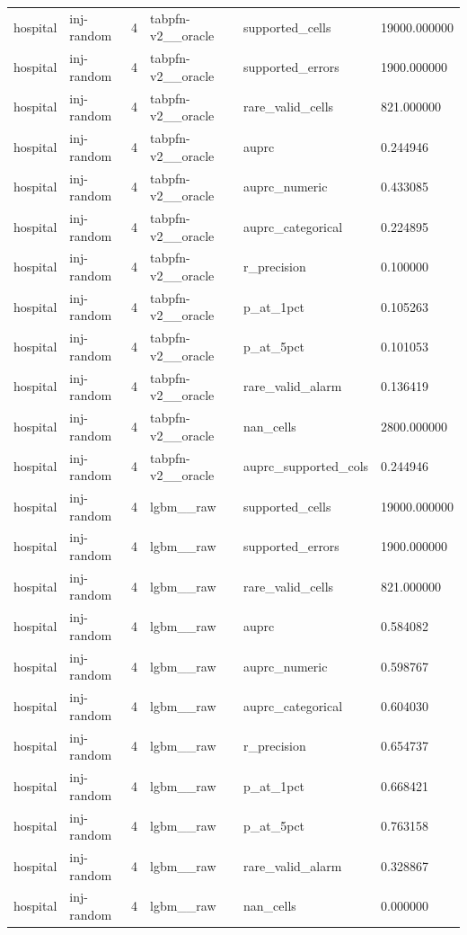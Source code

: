 \begin{tabular}{llllll}
hospital & inj-random & 4 & tabpfn-v2\_\_oracle & supported\_cells & 19000.000000 \\
hospital & inj-random & 4 & tabpfn-v2\_\_oracle & supported\_errors & 1900.000000 \\
hospital & inj-random & 4 & tabpfn-v2\_\_oracle & rare\_valid\_cells & 821.000000 \\
hospital & inj-random & 4 & tabpfn-v2\_\_oracle & auprc & 0.244946 \\
hospital & inj-random & 4 & tabpfn-v2\_\_oracle & auprc\_numeric & 0.433085 \\
hospital & inj-random & 4 & tabpfn-v2\_\_oracle & auprc\_categorical & 0.224895 \\
hospital & inj-random & 4 & tabpfn-v2\_\_oracle & r\_precision & 0.100000 \\
hospital & inj-random & 4 & tabpfn-v2\_\_oracle & p\_at\_1pct & 0.105263 \\
hospital & inj-random & 4 & tabpfn-v2\_\_oracle & p\_at\_5pct & 0.101053 \\
hospital & inj-random & 4 & tabpfn-v2\_\_oracle & rare\_valid\_alarm & 0.136419 \\
hospital & inj-random & 4 & tabpfn-v2\_\_oracle & nan\_cells & 2800.000000 \\
hospital & inj-random & 4 & tabpfn-v2\_\_oracle & auprc\_supported\_cols & 0.244946 \\
hospital & inj-random & 4 & lgbm\_\_raw & supported\_cells & 19000.000000 \\
hospital & inj-random & 4 & lgbm\_\_raw & supported\_errors & 1900.000000 \\
hospital & inj-random & 4 & lgbm\_\_raw & rare\_valid\_cells & 821.000000 \\
hospital & inj-random & 4 & lgbm\_\_raw & auprc & 0.584082 \\
hospital & inj-random & 4 & lgbm\_\_raw & auprc\_numeric & 0.598767 \\
hospital & inj-random & 4 & lgbm\_\_raw & auprc\_categorical & 0.604030 \\
hospital & inj-random & 4 & lgbm\_\_raw & r\_precision & 0.654737 \\
hospital & inj-random & 4 & lgbm\_\_raw & p\_at\_1pct & 0.668421 \\
hospital & inj-random & 4 & lgbm\_\_raw & p\_at\_5pct & 0.763158 \\
hospital & inj-random & 4 & lgbm\_\_raw & rare\_valid\_alarm & 0.328867 \\
hospital & inj-random & 4 & lgbm\_\_raw & nan\_cells & 0.000000 \\

\end{tabular}

